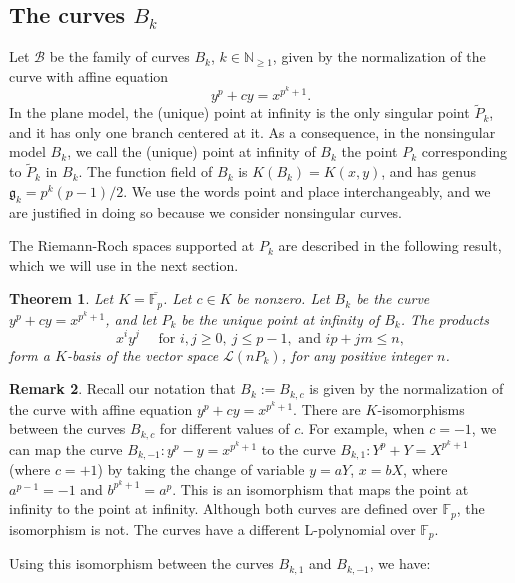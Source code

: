 \documentclass[oneside,a4paper,12pt]{article}
\newcommand{\F}{{\mathbb{F}}}
\theoremstyle{plain} %
\newtheorem{theorem}{Theorem}[section]
\theoremstyle{definition} %
\newtheorem{remark}[theorem]{Remark}
\begin{document}
\subsection{The curves $B_k$}

Let $\mathcal{B}$ be the family of curves $B_k$, $k\in \mathbb{N}_{\geq 1}$, given by the normalization of the curve with affine equation
\[
y^p+c y=x^{p^k+1}.
\]
In the plane model, the (unique) point at infinity is the only singular point $\tilde{P}_k$, and it has only one branch centered at it. As a consequence, in the nonsingular model $B_k$, we call the (unique) point at infinity of $B_k$ the point $P_k$ corresponding to $\tilde{P}_k$ in $B_k$.
The function field of $B_k$ is $K(B_k)=K(x,y)$, and has genus $\mathfrak{g}_k=p^k(p-1)/2$.
We use the words point and place interchangeably, and we are justified in doing so because we consider nonsingular curves.

The Riemann-Roch spaces supported at $P_k$ are described in the following result, which we will use in the next section.

\begin{theorem}\cite[Prop. 6.4.1]{StichBook}\label{th: basis RR Sp}
    Let $K=\overline{\F_p}$. Let $c \in K$ be nonzero. 
    Let $B_k$ be the curve $y^p+c y=x^{p^k+1}$, and let $P_k$ be the unique point at infinity of $B_k$. 
    The products 
    \[
        x^iy^j \quad \text{ for } i,j \geq 0, \ j\leq p-1, \text{ and } ip+jm \leq n,
    \]
    form a $K$-basis of the vector space $\mathcal{L}(nP_{k})$, for any positive integer $n$.
\end{theorem}





\begin{remark} \label{iso between Bk + and -}
Recall our notation that 
$B_k:=B_{k,c}$ is given by the normalization of the curve with affine equation
$y^p+c y=x^{p^k+1}$.
There are $K$-isomorphisms between the curves $B_{k,c}$
for different values of $c$. For example, when $c=-1$,
we can map the curve $B_{k,-1} : y^p-y=x^{p^k+1}$ to the curve 
$B_{k,1}: Y^p+Y=X^{p^k+1}$ (where $c=+1$)
by taking the change of variable $y=aY$, $x=bX$, where $a^{p-1}=-1$ and $b^{p^k+1}=a^p$.
This is an isomorphism that maps the point at infinity to the point at infinity. 
Although both curves are defined over $\F_p$, the isomorphism is not.
The curves have a different L-polynomial over $\F_p$.
\end{remark}


Using  this isomorphism between the curves $B_{k,1}$ and $B_{k,-1}$, we have:
\end{document}
